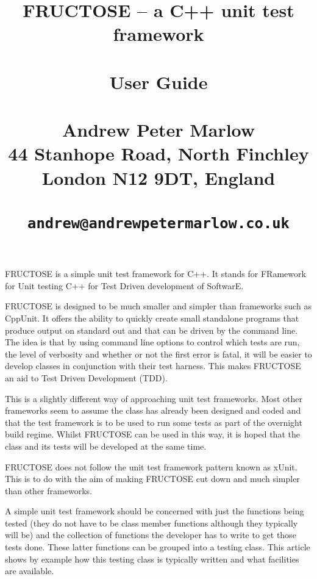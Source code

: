 \documentclass{book}
\begin{document}
 
\title{FRUCTOSE -- a C++ unit test framework \\
\hfil\break \\
User Guide \\
\hfil\break \\
Andrew Peter Marlow \\
44 Stanhope Road, North Finchley \\ 
London N12 9DT, England \\ 
\hfil\break \\
{\tt andrew@andrewpetermarlow.co.uk}} 
\maketitle 
% 

\tableofcontents

\vfil\eject




FRUCTOSE is a simple unit test framework for C++. 
It stands for FRamework for Unit testing C++ for Test Driven
development of SoftwarE.


FRUCTOSE is designed to be much smaller and simpler than frameworks such as
CppUnit. It offers the ability to quickly create small standalone programs that
produce output on standard out and that can be  driven by the command line. 
The idea is that by using command line options
to control which tests are run, the level of verbosity and whether or not
the first error is fatal, it will be easier to develop classes in conjunction
with their test harness. This makes FRUCTOSE an aid to Test Driven
Development (TDD).

This is a slightly different way of approaching unit test frameworks.
Most other frameworks seem to assume the class has already been designed
and coded and that the test framework is to be used to run some tests as
part of the overnight build regime. Whilst FRUCTOSE can be used in this way,
it is hoped that the class and its tests will be developed at the same time.

FRUCTOSE does not follow the unit test framework pattern known as xUnit.
This is to do with the aim of making FRUCTOSE cut down and much simpler
than other frameworks.

A simple unit test framework should be concerned with just the functions being
tested (they do not have to be class member functions although they typically
will be) and the collection of functions the developer has to write to get
those tests done. These latter functions can be grouped into a testing class.
This article shows by example how this testing class is typically written
and what facilities are available.
\end{document}
